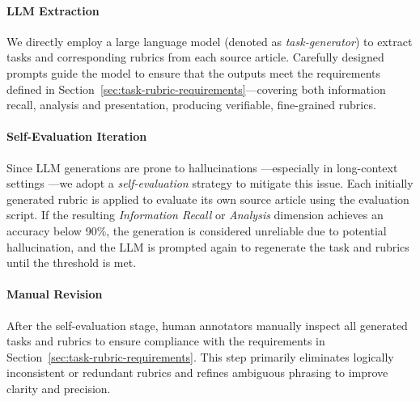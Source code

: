 \documentclass[11pt]{article}
\begin{document}
\paragraph{LLM Extraction}
We directly employ a large language model (denoted as \textit{task-generator}) to extract tasks and corresponding rubrics from each source article. Carefully designed prompts guide the model to ensure that the outputs meet the requirements defined in Section~\ref{sec:task-rubric-requirements}---covering both information recall, analysis and presentation, producing verifiable, fine-grained rubrics.

\paragraph{Self-Evaluation Iteration}
Since LLM generations are prone to hallucinations \citep{simhi2025trustmeimwrong, Huang_2025}---especially in long-context settings \citep{ Farquhar2024DetectingHL, liu2025longcontexthallucinationdetection}---we adopt a \textit{self-evaluation} strategy to mitigate this issue. Each initially generated rubric is applied to evaluate its own source article using the evaluation script.  
If the resulting \textit{Information Recall} or \textit{Analysis} dimension achieves an accuracy below 90\%, the generation is considered unreliable due to potential hallucination, and the LLM is prompted again to regenerate the task and rubrics until the threshold is met.

\paragraph{Manual Revision}
After the self-evaluation stage, human annotators manually inspect all generated tasks and rubrics to ensure compliance with the requirements in Section~\ref{sec:task-rubric-requirements}. This step primarily eliminates logically inconsistent or redundant rubrics and refines ambiguous phrasing to improve clarity and precision.
\end{document}
